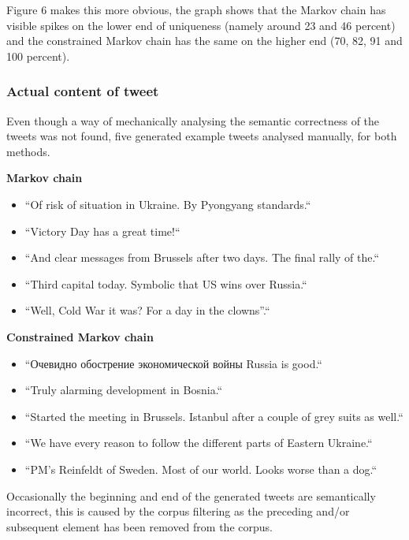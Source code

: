 \documentclass[a4paper,12pt]{article}
\begin{document}
Figure 6 makes this more obvious, the graph shows that the Markov chain has visible spikes on the lower end of uniqueness (namely around 23 and 46 percent) and the constrained Markov chain has the same on the higher end (70, 82, 91 and 100 percent).

\subsubsection{Actual content of tweet}
Even though a way of mechanically analysing the semantic correctness of the tweets was not found, five generated example tweets analysed manually, for both methods.

\textbf{Markov chain}

\begin{itemize}
\setlength\itemsep{-0.8em}
\item ``Of risk of situation in Ukraine. By Pyongyang standards.``
\item ``Victory Day has a great time!\hspace{0 cm}``
\item ``And clear messages from Brussels after two days. The final rally of the.``
\item ``Third capital today. Symbolic that US wins over Russia.``
\item ``Well, Cold War it was? For a day in the clowns''.``
\end{itemize}

\textbf{Constrained Markov chain}

\begin{itemize}
\setlength\itemsep{-0.8em}
\item ``Очевидно обострение экономической войны Russia is good.``
\item ``Truly alarming development in Bosnia.`` %
\item ``Started the meeting in Brussels. Istanbul after a couple of grey suits as well.``
\item ``We have every reason to follow the different parts of Eastern Ukraine.``
\item ``PM's Reinfeldt of Sweden. Most of our world. Looks worse than a dog.``
\end{itemize}

Occasionally the beginning and end of the generated tweets are semantically incorrect, this is caused by the corpus filtering as the preceding and/or subsequent element has been removed from the corpus.
\end{document}
